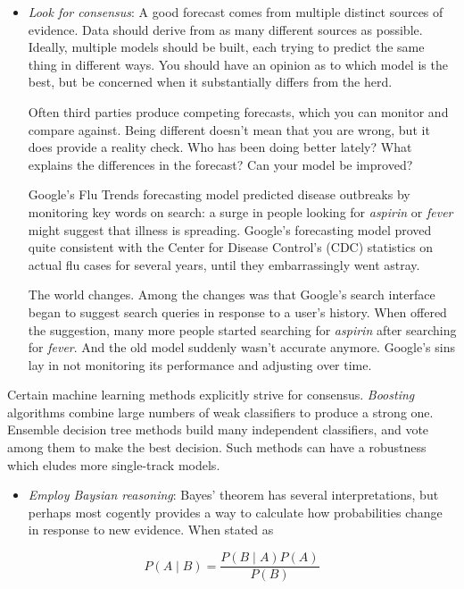 \documentclass[10pt]{article}
\begin{document}
\begin{itemize}
  \item \textit{Look for consensus}: A good forecast comes from multiple distinct sources of evidence. Data should derive from as many different sources as possible. Ideally, multiple models should be built, each trying to predict the same thing in different ways. You should have an opinion as to which model is the best, but be concerned when it substantially differs from the herd.
  
  Often third parties produce competing forecasts, which you can monitor and compare against. Being different doesn’t mean that you are wrong, but it does provide a reality check. Who has been doing better lately? What explains the differences in the forecast? Can your model be improved?
  
  Google’s Flu Trends forecasting model predicted disease outbreaks by monitoring key words on search: a surge in people looking for \textit{aspirin} or \textit{fever} might suggest that illness is spreading. Google’s forecasting model proved quite consistent with the Center for Disease Control’s (CDC) statistics on actual flu cases for several years, until they embarrassingly went astray.
  
  The world changes. Among the changes was that Google’s search interface began to suggest search queries in response to a user’s history. When offered the suggestion, many more people started searching for \textit{aspirin} after searching for \textit{fever}. And the old model suddenly wasn’t accurate anymore. Google’s sins lay in not monitoring its performance and adjusting over time.
\end{itemize}

Certain machine learning methods explicitly strive for consensus. \textit{Boosting} algorithms combine large numbers of weak classifiers to produce a strong one. Ensemble decision tree methods build many independent classifiers, and vote among them to make the best decision. Such methods can have a robustness which eludes more single-track models.

\begin{itemize}
  \item \textit{Employ Baysian reasoning}: Bayes’ theorem has several interpretations, but perhaps most cogently provides a way to calculate how probabilities change in response to new evidence. When stated as
\end{itemize}

\[ 
P(A \mid B)=\frac{P(B \mid A) P(A)}{P(B)} 
\]
\end{document}
